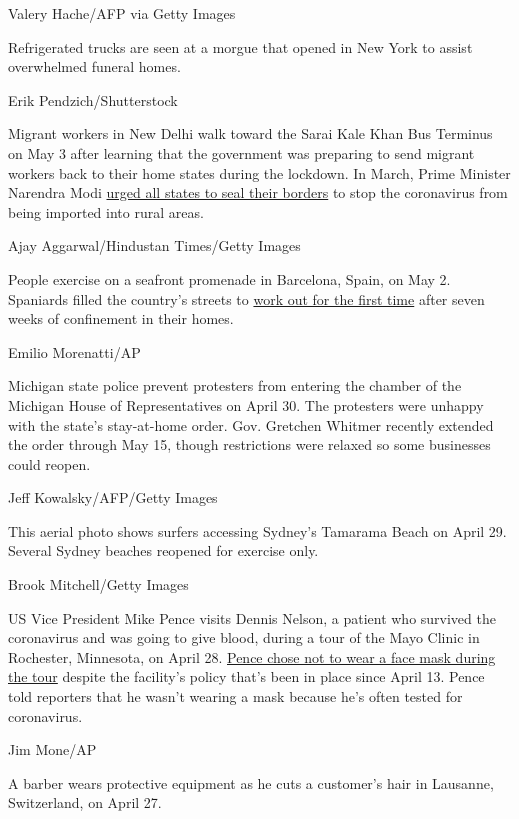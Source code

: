 Valery Hache/AFP via Getty Images

Refrigerated trucks are seen at a morgue that opened in New York to
assist overwhelmed funeral homes.

Erik Pendzich/Shutterstock

Migrant workers in New Delhi walk toward the Sarai Kale Khan Bus
Terminus on May 3 after learning that the government was preparing to
send migrant workers back to their home states during the lockdown. In
March, Prime Minister Narendra Modi
\href{http://www.cnn.com/2020/03/30/india/gallery/india-lockdown-migrant-workers/index.html}{urged
all states to seal their borders} to stop the coronavirus from being
imported into rural areas.

Ajay Aggarwal/Hindustan Times/Getty Images

People exercise on a seafront promenade in Barcelona, Spain, on May 2.
Spaniards filled the country's streets to
\href{https://www.cnn.com/2020/05/02/europe/spain-lockdown-coronavirus-exercise-intl/index.html}{work
out for the first time} after seven weeks of confinement in their homes.

Emilio Morenatti/AP

Michigan state police prevent protesters from entering the chamber of
the Michigan House of Representatives on April 30. The protesters were
unhappy with the state's stay-at-home order. Gov. Gretchen Whitmer
recently extended the order through May 15, though restrictions were
relaxed so some businesses could reopen.

Jeff Kowalsky/AFP/Getty Images

This aerial photo shows surfers accessing Sydney's Tamarama Beach on
April 29. Several Sydney beaches reopened for exercise only.

Brook Mitchell/Getty Images

US Vice President Mike Pence visits Dennis Nelson, a patient who
survived the coronavirus and was going to give blood, during a tour of
the Mayo Clinic in Rochester, Minnesota, on April 28.
\href{https://www.cnn.com/2020/04/28/politics/mike-pence-mayo-clinic-mask/index.html}{Pence
chose not to wear a face mask during the tour} despite the facility's
policy that's been in place since April 13. Pence told reporters that he
wasn't wearing a mask because he's often tested for coronavirus.

Jim Mone/AP

A barber wears protective equipment as he cuts a customer's hair in
Lausanne, Switzerland, on April 27.

